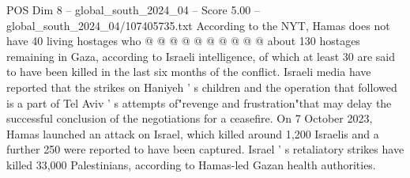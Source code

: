 \begin{textsample}{POS Dim 8 – global\_south\_2024\_04 – Score 5.00 – global\_south\_2024\_04/107405735.txt}
According to the NYT, Hamas does not have 40 living hostages who @ @ @ @ @ @ @ @ @ @ about 130 hostages remaining in Gaza, according to Israeli intelligence, of which at least 30 are said to have been killed in the last six months of the conflict.
Israeli media have reported that the strikes on Haniyeh ' s children and the operation that followed is a part of Tel Aviv ' s attempts of"revenge and frustration"that may delay the successful conclusion of the negotiations for a ceasefire.
On 7 October 2023, Hamas launched an attack on Israel, which killed around 1,200 Israelis and a further 250 were reported to have been captured.
Israel ' s retaliatory strikes have killed 33,000 Palestinians, according to Hamas-led Gazan health authorities.

\end{textsample}
